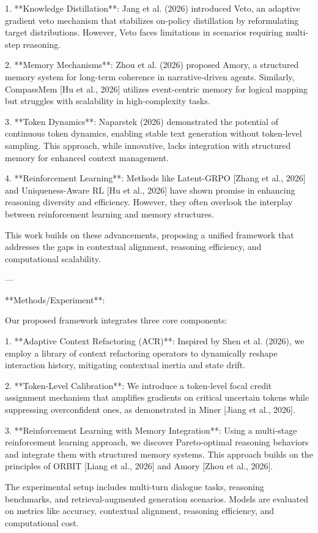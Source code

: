 1. **Knowledge Distillation**: Jang et al. (2026) introduced Veto, an adaptive gradient veto mechanism that stabilizes on-policy distillation by reformulating target distributions. However, Veto faces limitations in scenarios requiring multi-step reasoning.
   
2. **Memory Mechanisms**: Zhou et al. (2026) proposed Amory, a structured memory system for long-term coherence in narrative-driven agents. Similarly, CompassMem [Hu et al., 2026] utilizes event-centric memory for logical mapping but struggles with scalability in high-complexity tasks.

3. **Token Dynamics**: Naparstek (2026) demonstrated the potential of continuous token dynamics, enabling stable text generation without token-level sampling. This approach, while innovative, lacks integration with structured memory for enhanced context management.

4. **Reinforcement Learning**: Methods like Latent-GRPO [Zhang et al., 2026] and Uniqueness-Aware RL [Hu et al., 2026] have shown promise in enhancing reasoning diversity and efficiency. However, they often overlook the interplay between reinforcement learning and memory structures.

This work builds on these advancements, proposing a unified framework that addresses the gaps in contextual alignment, reasoning efficiency, and computational scalability.

---

**Methods/Experiment**:  

Our proposed framework integrates three core components:

1. **Adaptive Context Refactoring (ACR)**: Inspired by Shen et al. (2026), we employ a library of context refactoring operators to dynamically reshape interaction history, mitigating contextual inertia and state drift.

2. **Token-Level Calibration**: We introduce a token-level focal credit assignment mechanism that amplifies gradients on critical uncertain tokens while suppressing overconfident ones, as demonstrated in Miner [Jiang et al., 2026].

3. **Reinforcement Learning with Memory Integration**: Using a multi-stage reinforcement learning approach, we discover Pareto-optimal reasoning behaviors and integrate them with structured memory systems. This approach builds on the principles of ORBIT [Liang et al., 2026] and Amory [Zhou et al., 2026].

The experimental setup includes multi-turn dialogue tasks, reasoning benchmarks, and retrieval-augmented generation scenarios. Models are evaluated on metrics like accuracy, contextual alignment, reasoning efficiency, and computational cost.

